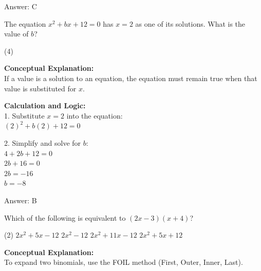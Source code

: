 \documentclass[11pt,paper=a4,answers]{exam}
\begin{document}
\begin{questions}
\begin{solution}
Answer: \colorbox{yellow!100}{C}
\end{solution}

\vspace{30pt}

\question
The equation $x^2 + bx + 12 = 0$ has $x = 2$ as one of its solutions. What is the value of $b$?
\begin{tasks}(4)
\end{tasks}

\begin{solution}
\textbf{Conceptual Explanation:} \\
If a value is a solution to an equation, the equation must remain true when that value is substituted for $x$.

\vspace{15pt}

\textbf{Calculation and Logic:} \\
1. Substitute $x = 2$ into the equation: \\
   $(2)^2 + b(2) + 12 = 0$

\vspace{10pt}

2. Simplify and solve for $b$: \\
   $4 + 2b + 12 = 0$ \\
   $2b + 16 = 0$ \\
   $2b = -16$ \\
   $b = -8$

\vspace{20pt}

Answer: \colorbox{yellow!100}{B}
\end{solution}

\vspace{30pt}

\question
Which of the following is equivalent to $(2x - 3)(x + 4)$?
\begin{tasks}(2)
    \task $2x^2 + 5x - 12$
    \task $2x^2 - 12$
    \task $2x^2 + 11x - 12$
    \task $2x^2 + 5x + 12$
\end{tasks}

\begin{solution}
\textbf{Conceptual Explanation:} \\
To expand two binomials, use the FOIL method (First, Outer, Inner, Last).


\end{solution}
\end{questions}
\end{document}
